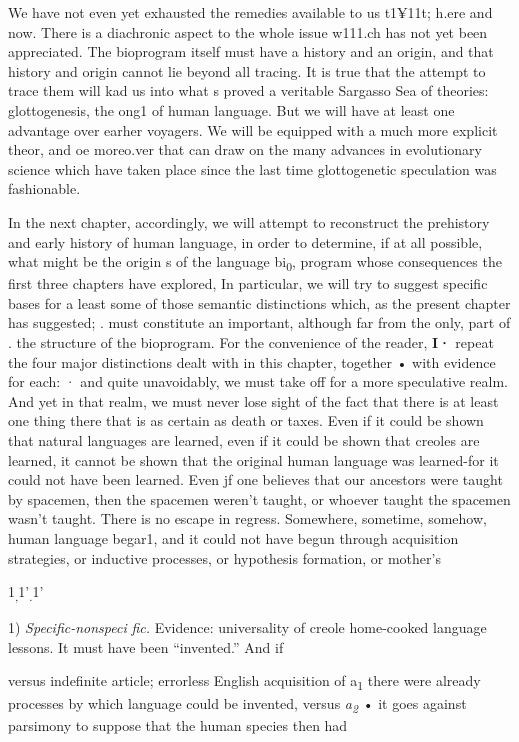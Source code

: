 We have not even yet exhausted the remedies available to us t1¥11t; h.ere and now. There is a diachronic aspect to the whole issue w111.ch has not yet been appreciated. The bioprogram itself must have a history and an origin, and that history and origin cannot lie beyond all tracing. It is true that the attempt to trace them will kad us into what s proved a veritable Sargasso Sea of theories: glottogenesis, the ong1 of human language. But we will have at least one advantage over earher voyagers. We will be equipped with a much more explicit theor, and oe moreo.ver that can draw on the many advances in
evolutionary science which have taken place since the last time glotto\-genetic speculation was fashionable.

In the next chapter, accordingly, we will attempt to reconstruct the prehistory and early history of human language, in order to deter\-mine, if at all possible, what might be the origin s of the language bi\textsubscript{0}, program whose consequences the first three chapters have explored, In particular, we will try to suggest specific bases for a least some of those semantic distinctions which, as the present chapter has suggested; . must constitute an important, although far from the only, part of . the structure of the bioprogram. For the convenience of the reader, \textbf{I·} repeat the four major distinctions dealt with in this chapter, together • with evidence for each: ·
and quite unavoidably, we must take off for a more speculative realm. And yet in that realm, we must never lose sight of the fact that there is at least one thing there that is as certain as death or taxes. Even if it could be shown that natural languages are learned, even if it could
be shown that creoles are learned, it cannot be shown that the original human language was learned{}-for it could not have been learned. Even jf one believes that our ancestors were taught by spacemen, then the spacemen weren't taught, or whoever taught the spacemen wasn't taught. There is no escape in regress. Somewhere, sometime, somehow, human language begar1, and it could not have begun through acquisition strategies, or inductive processes, or hypothesis formation, or mother's

1\textsubscript{,}1'\textsubscript{.}1'

1) \textit{S}\textit{pec}\textit{i}\textit{fic-nonspeci} \textit{fic. }Evidence: universality of creole home-cooked language lessons. It must have been ``invented.'' And if

versus indefinite article; errorless English acquisition of a\textsubscript{1 }there were already processes by which language could be invented, versus \textit{a}\textit{\textsubscript{2}}\textsubscript{ }• it goes against parsimony to suppose that the human species then had

